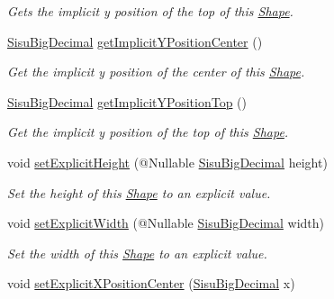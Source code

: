 \begin{DoxyCompactItemize}
\begin{DoxyCompactList}\small\item\em Gets the implicit y position of the top of this \hyperlink{classcom_1_1aarrelaakso_1_1drawl_1_1_shape}{Shape}. \end{DoxyCompactList}\item 
\hyperlink{classcom_1_1aarrelaakso_1_1drawl_1_1_sisu_big_decimal}{Sisu\+Big\+Decimal} \hyperlink{classcom_1_1aarrelaakso_1_1drawl_1_1_shape_ad10def6c8dd7cbe03c281817406ab461}{get\+Implicit\+Y\+Position\+Center} ()
\begin{DoxyCompactList}\small\item\em Get the implicit y position of the center of this \hyperlink{classcom_1_1aarrelaakso_1_1drawl_1_1_shape}{Shape}. \end{DoxyCompactList}\item 
\hyperlink{classcom_1_1aarrelaakso_1_1drawl_1_1_sisu_big_decimal}{Sisu\+Big\+Decimal} \hyperlink{classcom_1_1aarrelaakso_1_1drawl_1_1_shape_a5ffc02627cca0723e3555b5d04ba2b75}{get\+Implicit\+Y\+Position\+Top} ()
\begin{DoxyCompactList}\small\item\em Get the implicit y position of the top of this \hyperlink{classcom_1_1aarrelaakso_1_1drawl_1_1_shape}{Shape}. \end{DoxyCompactList}\item 
void \hyperlink{classcom_1_1aarrelaakso_1_1drawl_1_1_shape_a37e0c4b85c07c4c87a24609ae1cb50a5}{set\+Explicit\+Height} (@Nullable \hyperlink{classcom_1_1aarrelaakso_1_1drawl_1_1_sisu_big_decimal}{Sisu\+Big\+Decimal} height)
\begin{DoxyCompactList}\small\item\em Set the height of this \hyperlink{classcom_1_1aarrelaakso_1_1drawl_1_1_shape}{Shape} to an explicit value. \end{DoxyCompactList}\item 
void \hyperlink{classcom_1_1aarrelaakso_1_1drawl_1_1_shape_a976c002388892d227697cab39c1e5724}{set\+Explicit\+Width} (@Nullable \hyperlink{classcom_1_1aarrelaakso_1_1drawl_1_1_sisu_big_decimal}{Sisu\+Big\+Decimal} width)
\begin{DoxyCompactList}\small\item\em Set the width of this \hyperlink{classcom_1_1aarrelaakso_1_1drawl_1_1_shape}{Shape} to an explicit value. \end{DoxyCompactList}\item 
void \hyperlink{classcom_1_1aarrelaakso_1_1drawl_1_1_shape_a8e4c74480fede49f44519554136c12b0}{set\+Explicit\+X\+Position\+Center} (\hyperlink{classcom_1_1aarrelaakso_1_1drawl_1_1_sisu_big_decimal}{Sisu\+Big\+Decimal} x)

\end{DoxyCompactItemize}
